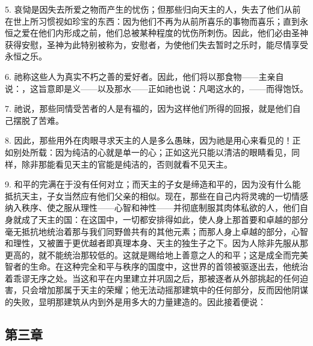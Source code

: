 5. 哀恸是因失去所爱之物而产生的忧伤；但那些归向天主的人，失去了他们从前在世上所习惯视如珍宝的东西：因为他们不再为从前所喜乐的事物而喜乐；直到永恒之爱在他们内形成之前，他们总被某种程度的忧伤所刺伤。因此，他们必由圣神获得安慰，圣神为此特别被称为，安慰者，为使他们失去暂时之乐时，能尽情享受永恒之乐。\par

6. 祂称这些人为真实不朽之善的爱好者。因此，他们将以那食物——主亲自说：，这旨意即是义——以及那水——正如祂也说：凡喝这水的，——而得饱饫。\par

7. 祂说，那些同情受苦者的人是有福的，因为这样他们所得的回报，就是他们自己摆脱了苦难。\par

8. 因此，那些用外在肉眼寻求天主的人是多么愚昧，因为祂是用心来看见的！正如别处所载：因为纯洁的心就是单一的心；正如这光只能以清洁的眼睛看见，同样，除非那能看见天主的官能是纯洁的，否则就看不见天主。\par

9. 和平的完满在于没有任何对立；而天主的子女是缔造和平的，因为没有什么能抵抗天主，子女当然应有他们父亲的相似。现在，那些在自己内将灵魂的一切情感纳入秩序、使之服从理性——心智和神性——并彻底制服其肉体私欲的人，他们自身就成了天主的国：在这国中，一切都安排得如此，使人身上那首要和卓越的部分毫无抵抗地统治着那与我们同野兽共有的其他元素；而那人身上卓越的部分，心智和理性，又被置于更优越者即真理本身、天主的独生子之下。因为人除非先服从那更高的，就不能统治那较低的。这就是赐给地上善意之人的和平；这是成全而完美智者的生命。在这种完全和平与秩序的国度中，这世界的首领被驱逐出去，他统治着乖谬无序之处。当这和平在内里建立并巩固之后，那被逐者从外部挑起的任何迫害，只会增加那属于天主的荣耀；他无法动摇那建筑中的任何部分，反而因他阴谋的失败，显明那建筑从内到外是用多大的力量建造的。因此接着便说：\par


\subsection{第三章}

